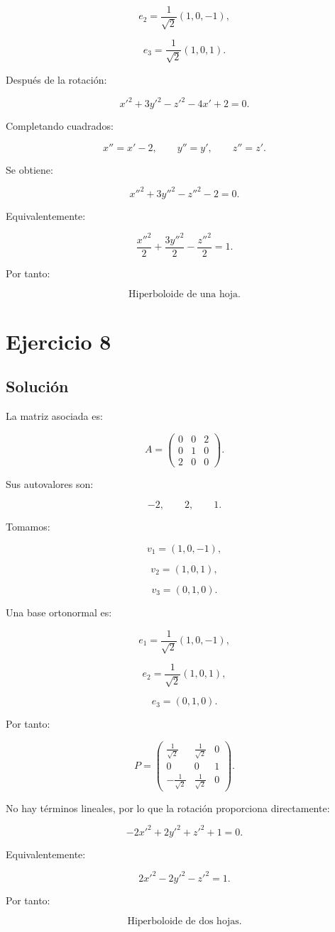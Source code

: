 \documentclass[11pt,a4paper]{article}
\begin{document}
\[
e_2=
\frac1{\sqrt2}(1,0,-1),
\]

\[
e_3=
\frac1{\sqrt2}(1,0,1).
\]

Después de la rotación:

\[
x'^2+3y'^2-z'^2-4x'+2=0.
\]

Completando cuadrados:

\[
x''=x'-2,
\qquad
y''=y',
\qquad
z''=z'.
\]

Se obtiene:

\[
\boxed{
x''^2+3y''^2-z''^2-2=0.
}
\]

Equivalentemente:

\[
\boxed{
\frac{x''^2}{2}
+
\frac{3y''^2}{2}
-
\frac{z''^2}{2}
=
1.
}
\]

Por tanto:

\[
\boxed{\text{Hiperboloide de una hoja}.}
\]

\section{Ejercicio 8}
\subsection{Solución}

La matriz asociada es:

\[
A=
\begin{pmatrix}
0&0&2\\
0&1&0\\
2&0&0
\end{pmatrix}.
\]

Sus autovalores son:

\[
-2,\qquad2,\qquad1.
\]

Tomamos:

\[
v_1=(1,0,-1),
\]

\[
v_2=(1,0,1),
\]

\[
v_3=(0,1,0).
\]

Una base ortonormal es:

\[
e_1=
\frac1{\sqrt2}(1,0,-1),
\]

\[
e_2=
\frac1{\sqrt2}(1,0,1),
\]

\[
e_3=(0,1,0).
\]

Por tanto:

\[
P=
\begin{pmatrix}
\frac1{\sqrt2}&\frac1{\sqrt2}&0\\
0&0&1\\
-\frac1{\sqrt2}&\frac1{\sqrt2}&0
\end{pmatrix}.
\]

No hay términos lineales, por lo que la rotación proporciona directamente:

\[
\boxed{
-2x'^2+2y'^2+z'^2+1=0.
}
\]

Equivalentemente:

\[
\boxed{
2x'^2-2y'^2-z'^2=1.
}
\]

Por tanto:

\[
\boxed{\text{Hiperboloide de dos hojas}.}
\]
\end{document}
